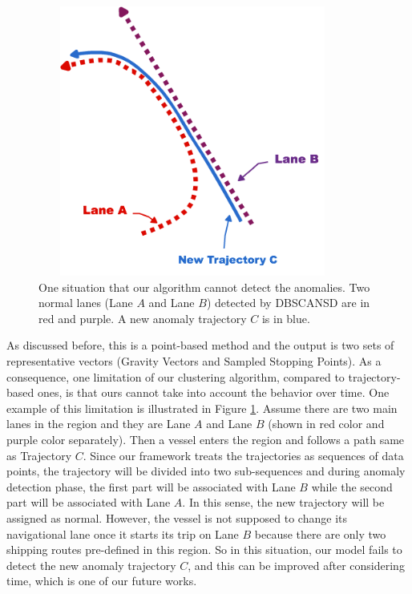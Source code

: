 \documentclass[12pt,glossary]{dalcsthesis}
\begin{document}
\begin{figure}[!htb]
\centering
\includegraphics[width=4in,height=3.5in]{limitation3.png}
\caption{One situation that our algorithm cannot detect the anomalies. Two normal lanes (Lane $A$ and Lane $B$) detected by DBSCANSD are in red and purple. A new anomaly trajectory $C$ is in blue.}
\label{fig:limitation3}
\end{figure}


As discussed before, this is a point-based method and the output is two sets of representative vectors (Gravity Vectors and Sampled Stopping Points). As a consequence, one limitation of our clustering algorithm, compared to trajectory-based ones, is that ours cannot take into account the behavior over time.  One example of this limitation is illustrated in Figure \ref{fig:limitation3}. Assume there are two main lanes in the region and they are Lane $A$ and Lane $B$ (shown in red color and purple color separately). Then a vessel enters the region and follows a path same as Trajectory $C$. Since our framework treats the trajectories as sequences of data points, the trajectory will be divided into two sub-sequences and during anomaly detection phase, the first part will be associated with Lane $B$ while the second part will be associated with Lane $A$. In this sense, the new trajectory will be assigned as normal. However, the vessel is not supposed to change its navigational lane once it starts its trip on Lane $B$ because there are only two shipping routes pre-defined in this region. So in this situation, our model fails to detect the new anomaly trajectory $C$, and this can be improved after considering time, which is one of our future works.
\end{document}
